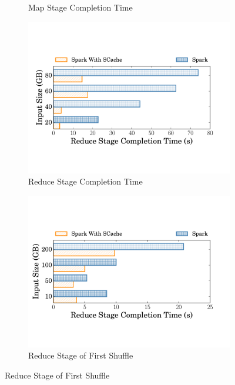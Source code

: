 \begin{figure}
\begin{minipage}[t]{.32\linewidth}
\begin{subfigure}{\linewidth}
\begin{minipage}{\linewidth}
				\caption{Map Stage Completion Time}
				\label{fig:mapstage}
			\end{minipage}
			\begin{minipage}{\linewidth}
				\includegraphics[width=\linewidth]{fig/groupbyreducestage}
				\caption{Reduce Stage Completion Time}
				\label{fig:reducestage}	
			\end{minipage}
		\end{subfigure}
		\caption{Stage Completion Time of Single Shuffle Test}
		\label{fig:singleshuffle}
	\end{minipage}
	\begin{minipage}[t]{.32\linewidth}
		\begin{subfigure}{\linewidth}
			\begin{minipage}{\linewidth}
				\includegraphics[width=\linewidth]{fig/tera}
				\caption{Reduce Stage of First Shuffle}
				\label{fig:terasort}
			\end{minipage}


\end{subfigure}
\end{minipage}
\end{figure}
